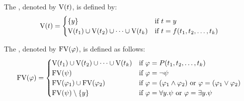 \begin{definition}
	The , denoted by $\text{V}(t)$, is defined by:
	\[\V(t)=
		\begin{cases}
			\{y\}                                    & \text{if $t=y$}                    \\ %
			\V(t_1)\cup \V(t_2)\cup\dots\cup \V(t_k) & \text{if $t=f(t_1,t_2,\dots,t_k)$} 
		\end{cases}\]
	
	The , denoted by $\text{FV}(\varphi)$, is defined as follows:
	\[\FV(\varphi)=
		\begin{cases} %
			\V(t_1)\cup \V(t_2)\cup\dots\cup \V(t_k) & \text{if $\varphi=P(t_1,t_2,\dots,t_k)$}                               \\
			\FV(\psi)                                 & \text{if $\varphi=\neg\psi$}                               \\
			\FV(\varphi_1)\cup\FV(\varphi_2)         & \text{if $\varphi=(\varphi_1\wedge\varphi_2)$ or $\varphi=(\varphi_1\vee\varphi_2)$} \\
			\FV(\psi)\setminus\{y\}                  & \text{if $\varphi=\forall y.\psi$ or $\varphi=\exists y.\psi$}                 
		\end{cases}\]
\end{definition}


